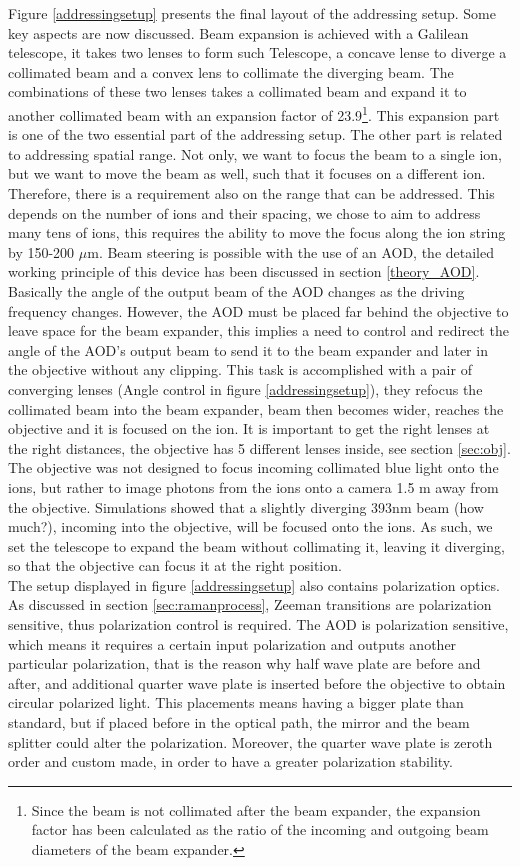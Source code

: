 Figure \ref{addressingsetup} presents the final layout of the addressing setup. Some key aspects are now discussed. Beam expansion is achieved with a Galilean telescope, it takes two lenses to form such Telescope, a concave lense to diverge a collimated beam and a convex lens to collimate the diverging beam. The combinations of these two lenses takes a collimated beam and expand it to another collimated beam with an expansion factor of 23.9\footnote{Since the beam is not collimated after the beam expander, the expansion factor has been calculated as the ratio of the incoming and outgoing beam diameters of the beam expander.}. This expansion part is one of the two essential part of the addressing setup. The other part is related to addressing spatial range. Not only, we want to focus the beam to a single ion, but we want to move the beam as well, such that it focuses on a different ion. Therefore, there is a requirement also on the range that can be addressed. This depends on the number of ions and their spacing, we chose to aim to address many tens of ions, this requires the ability to move the focus along the ion string by 150-200 $\mu$m. Beam steering is possible with the use of an AOD, the detailed working principle of this device has been discussed in section \ref{theory_AOD}. Basically the angle of the output beam of the AOD changes as the driving frequency changes. However, the AOD must be placed far behind the objective to leave space for the beam expander, this implies a need to control and redirect the angle of the AOD's output beam to send it to the beam expander and later in the objective without any clipping. This task is accomplished with a pair of converging lenses (Angle control in figure \ref{addressingsetup}), they refocus the collimated beam into the beam expander, beam then becomes wider, reaches the objective and it is focused on the ion. It is important to get the right lenses at the right distances, the objective has 5 different lenses inside, see section \ref{sec:obj}. The objective was not designed to focus incoming collimated blue light onto the ions, but rather to image photons from the ions onto a camera 1.5 m away from the objective. Simulations showed that a slightly diverging 393nm beam (how much?), incoming into the objective, will be focused onto the ions. As such, we set the telescope to expand the beam without collimating it, leaving it diverging, so that the objective can focus it at the right position.\\
The setup displayed in figure \ref{addressingsetup} also contains polarization optics. As discussed in section \ref{sec:ramanprocess}, Zeeman transitions are polarization sensitive, thus polarization control is required. The AOD is polarization sensitive, which means it requires a certain input polarization and outputs another particular polarization, that is the reason why half wave plate are before and after, and additional quarter wave plate is inserted before the objective to obtain circular polarized light. This placements means having a bigger plate than standard, but if placed before in the optical path, the mirror and the beam splitter could alter the polarization. Moreover, the quarter wave plate is zeroth order and custom made, in order to have a greater polarization stability.\\
